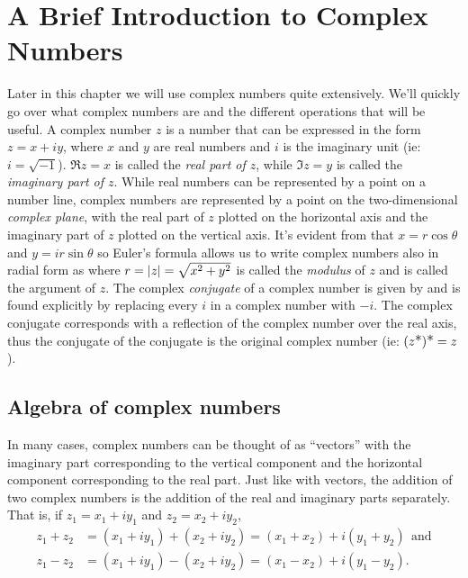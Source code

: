 \documentclass[12pt]{book}
\renewcommand{\star}{{\scalebox{1.1}{*} }}
\begin{document}
\section{A Brief Introduction to Complex Numbers}
Later in this chapter we will use complex numbers quite extensively.  We'll quickly go over what complex numbers are and the different operations that will be useful.  A complex number $z$ is a number that can be expressed in the form $z=x+iy$, where $x$ and $y$ are real numbers and $i$ is the imaginary unit (ie: $i = \sqrt{-1}$).  $\Re{z} = x$ is called the \textit{real part of $z$}, while $\Im{z} = y$ is called the \textit{imaginary part of $z$}.  While real numbers can be represented by a point on a number line, complex numbers are represented by a point on the two-dimensional \textit{complex plane}, with the real part of $z$ plotted on the horizontal axis and the imaginary part of $z$ plotted on the vertical axis.
It's evident from  that $x=r\cos\theta$ and $y = ir\sin\theta$ so Euler's formula allows us to write complex numbers also in radial form as
where $r=\left|z\right| = \sqrt{x^2 + y^2}$ is called the \textit{modulus} of $z$ and 
 is called the argument of $z$.   The complex \textit{conjugate} of a complex number is given by 
\unnumeq{z\star = x - iy}
and is found explicitly by replacing every $i$ in a complex number with $-i$.  The complex conjugate corresponds with a reflection of the complex number over the real axis, thus the conjugate of the conjugate is the original complex number (ie: $(z\star)\star = z$).

\subsection{Algebra of complex numbers}
In many cases, complex numbers can be thought of as ``vectors'' with the imaginary part corresponding to the vertical component and the horizontal component corresponding to the real part.  Just like with vectors, the addition of two complex numbers is the addition of the real and imaginary parts separately.  That is, if $z_1 = x_1+iy_1$ and $z_2 = x_2+iy_2$, 
\begin{align*}
z_1 + z_2 &= (x_1+iy_1) + (x_2+iy_2) = (x_1 + x_2) + i(y_1 + y_2) \ \ \mathrm{and} \\
z_1 - z_2 &= (x_1+iy_1) - (x_2+iy_2) = (x_1 - x_2) + i(y_1 - y_2).
\end{align*}
\end{document}
